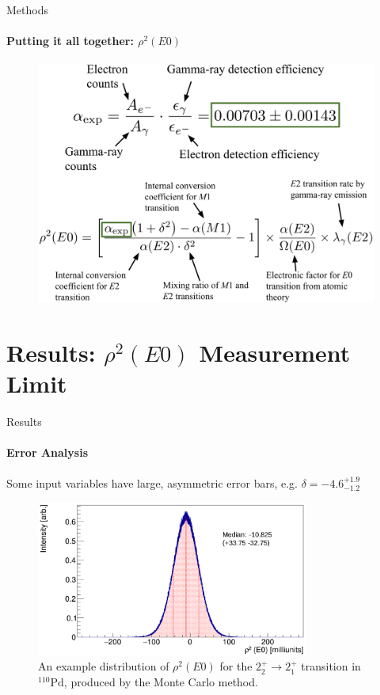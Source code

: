 \documentclass{beamer}
\begin{document}


\begin{frame}{Methods}
\framesubtitle{Putting it all together: $\rho^2(E0)$}
\begin{figure}[!hht]
  \centering
  \includegraphics[width=\textwidth, keepaspectratio]{AllTogether.png}
\end{figure}
\end{frame}

\section{Results: $\rho^2(E0)$ Measurement Limit}



\begin{frame}{Results}
\framesubtitle{Error Analysis}
Some input variables have large, asymmetric error bars, \newline
e.g. $\delta = -4.6^{+1.9}_{-1.2}$
\begin{figure}[!hht]
  \centering
  \includegraphics[width=0.8\textwidth, keepaspectratio]{MonteCarlo.png}
  \caption{An example distribution of $\rho^2(E0)$ for the $2^+_2 \rightarrow 2^+_1$ transition in $^{110}\mathrm{Pd}$, produced by the Monte Carlo method.}  \label{MonteCarloSim}
\end{figure}
\end{frame}
\end{document}
